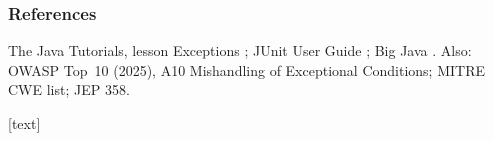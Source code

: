\documentclass[aspectratio=169,10pt,compress]{beamer}
\begin{document}
\begin{frame}[t,fragile] \frametitle{References}
	\small The Java Tutorials, lesson Exceptions \cite{TheJavaTutorials}; JUnit User Guide \cite{homeJunit}; Big Java \cite{horstmann2016big}.
	Also: OWASP Top~10 (2025), A10 Mishandling of Exceptional Conditions; MITRE CWE list; JEP 358.

	\vspace{1em}
	[text]
	
	\tiny
\end{frame}




\begin{frame}[t,fragile]
	\begin{center}
		\vspace{4cm}
	\end{center}
\end{frame}
\end{document}
